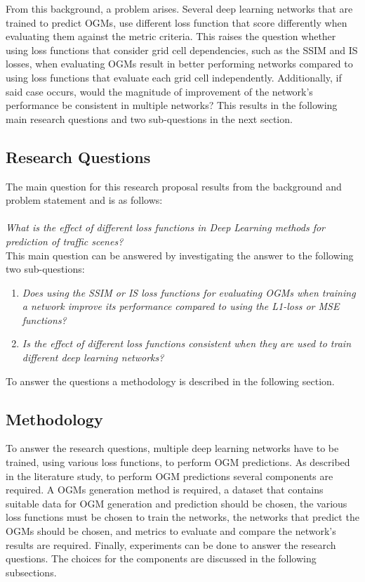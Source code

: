 From this background, a problem arises. Several deep learning networks that are trained to predict \glspl{OGM}, use different loss function that score differently when evaluating them against the metric criteria. This raises the question whether using loss functions that consider grid cell dependencies, such as the \gls{SSIM} and \gls{IS} losses, when evaluating \glspl{OGM} result in better performing networks compared to using loss functions that evaluate each grid cell independently. Additionally, if said case occurs, would the magnitude of improvement of the network's performance be consistent in multiple networks? This results in the following main research questions and two sub-questions in the next section. 

\subsection{Research Questions} \label{subsec:rp_questions}
The main question for this research proposal results from the background and problem statement and is as follows: \\ \\
\textit{What is the effect of different loss functions in Deep Learning methods for  prediction of traffic scenes?} \\

This main question can be answered by investigating the answer to the following two sub-questions:

\begin{enumerate}
	\item \textit{Does using the \gls{SSIM} or \gls{IS} loss functions for evaluating \glspl{OGM} when training a network improve its performance compared to using the L1-loss or \gls{MSE} functions?}
	\item \textit{Is the effect of different loss functions consistent when they are used to train different deep learning networks?}
\end{enumerate}

To answer the questions a methodology is described in the following section.

\subsection{Methodology}  \label{subsec:rp_methodology}
To answer the research questions, multiple deep learning networks have to be trained, using various loss functions, to perform \gls{OGM} predictions. As described in the literature study, to perform \gls{OGM} predictions several components are required. A \glspl{OGM} generation method is required, a dataset that contains suitable data for \gls{OGM} generation and prediction should be chosen, the various loss functions must be chosen to train the networks, the networks that predict the \glspl{OGM} should be chosen, and metrics to evaluate and compare the network's results are required. Finally, experiments can be done to answer the research questions. The choices for the components are discussed in the following subsections. 

